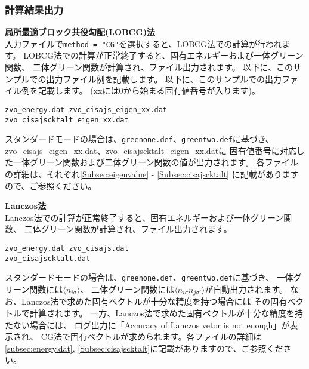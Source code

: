 \subsubsection{計算結果出力}
\begin{description}

\item {\bf 局所最適ブロック共役勾配(LOBCG)法}\\
入力ファイルで\verb|method = "CG"|を選択すると、LOBCG法での計算が行われます。
LOBCG法での計算が正常終了すると、固有エネルギーおよび一体グリーン関数、
  二体グリーン関数が計算され、ファイル出力されます。
以下に、このサンプルでの出力ファイル例を記載します。
以下に、このサンプルでの出力ファイル例を記載します。
(xxには0から始まる固有値番号が入ります)。

\begin{minipage}{14cm}
\begin{screen}
\begin{verbatim}
zvo_energy.dat zvo_cisajs_eigen_xx.dat
zvo_cisajscktalt_eigen_xx.dat
\end{verbatim}
\end{screen}
\end{minipage}

スタンダードモードの場合は、\verb|greenone.def|、\verb|greentwo.def|に基づき、
zvo\_cisajs\_eigen\_xx.dat、zvo\_cisajscktalt\_eigen\_xx.datに
固有値番号に対応した一体グリーン関数および二体グリーン関数の値が出力されます。
各ファイルの詳細は、それぞれ\ref{Subsec:eigenvalue} - \ref{Subsec:cisajscktalt}
に記載がありますので、ご参照ください。
  
\item {\bf Lanczos法}\\
  Lanczos法での計算が正常終了すると、固有エネルギーおよび一体グリーン関数、
  二体グリーン関数が計算され、ファイル出力されます。
  
\begin{minipage}{12cm}
\begin{screen}
\begin{verbatim}
zvo_energy.dat zvo_cisajs.dat 
zvo_cisajscktalt.dat  
\end{verbatim}
\end{screen}
\end{minipage}

スタンダードモードの場合は、\verb|greenone.def|、\verb|greentwo.def|に基づき、
一体グリーン関数には$\langle n_{i\sigma} \rangle$、
二体グリーン関数には$\langle n_{i\sigma} n_{j\sigma'} \rangle$が自動出力されます。
なお、Lanczos法で求めた固有ベクトルが十分な精度を持つ場合には
その固有ベクトルで計算されます。
一方、Lanczos法で求めた固有ベクトルが十分な精度を持たない場合には、
ログ出力に「Accuracy of Lanczos vetor is not enough」が表示され、
CG法で固有ベクトルが求められます。各ファイルの詳細は\ref{subsec:energy.dat},
\ref{Subsec:cisajscktalt}に記載がありますので、ご参照ください。


\end{description}
